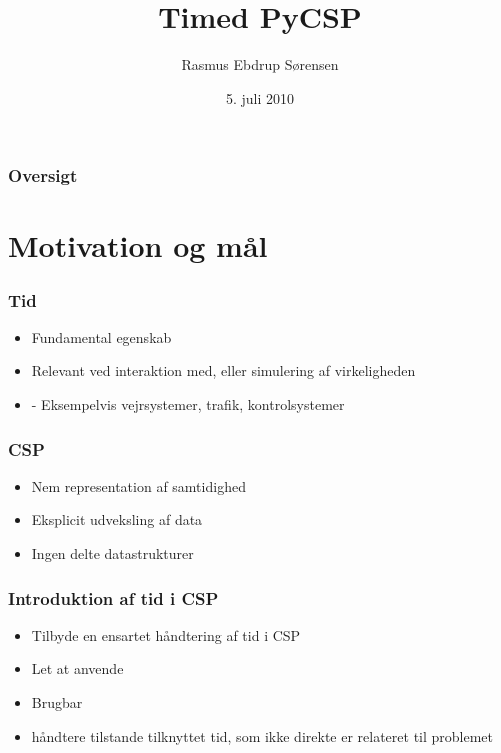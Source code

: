 \documentclass[12pt]{beamer}
\title
{Timed PyCSP}
\institute
{Datalogisk Institut \\ Københavns Universitet}
\author
{Rasmus Ebdrup Sørensen}
\date
{5. juli 2010}
\begin{document}
\frame[plain]\titlepage

\begin{frame}
  \frametitle{Oversigt}
  \tableofcontents
\end{frame}

\section{Motivation og mål}
\begin{frame}
  \frametitle{Tid}
  \begin{itemize}
	\item Fundamental egenskab
	\item Relevant ved interaktion med, eller simulering af virkeligheden
	\item - Eksempelvis vejrsystemer, trafik, kontrolsystemer 
  \end{itemize}
\end{frame}

\begin{frame}
  \frametitle{CSP}
  \begin{itemize}
	\item Nem representation af samtidighed
	\item Eksplicit udveksling af data
	\item Ingen delte datastrukturer
 \end{itemize}
\end{frame}

\begin{frame}
  \frametitle{Introduktion af tid i CSP}
  \begin{itemize}
	\item Tilbyde en ensartet håndtering af tid i CSP
	\item Let at anvende
	\item Brugbar
	\item håndtere tilstande tilknyttet tid, som ikke direkte er relateret til problemet
  \end{itemize}
\end{frame}
\end{document}
